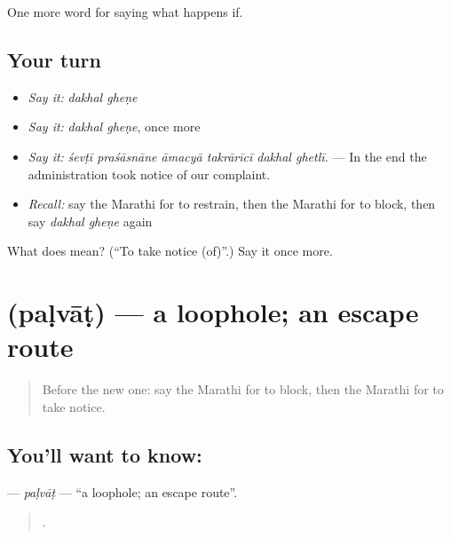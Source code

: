 \begin{grammarlens}[title={What you've built}]
One more word for saying what happens if.
\end{grammarlens}

\subsection*{Your turn}
\begin{itemize}
\raggedright
  \item \emph{Say it:} \emph{dakhal gheṇe}
  \item \emph{Say it:} \emph{dakhal gheṇe}, once more
  \item \emph{Say it:} \emph{śevṭī praśāsnāne āmacyā takrārīcī dakhal ghetlī.} — In the end the administration took notice of our complaint.
  \item \emph{Recall:} say the Marathi for to restrain, then the Marathi for to block, then say \emph{dakhal gheṇe} again
\end{itemize}

\begin{tcolorbox}[breakable,colback=teal!4,colframe=teal!35!black,title={Before you move on}]
What does   mean? (\textquotedblleft{}To take notice (of)\textquotedblright{}.) Say it once more.
\end{tcolorbox}
\section[\texorpdfstring{\mr{पळवाट} (paḷvāṭ)}{पळवाट (paḷvāṭ)}]{ (paḷvāṭ) — a loophole; an escape route}

\label{lesson:MR-C386-palvat}



\begin{quote}
Before the new one: say the Marathi for to block, then the Marathi for to take notice.
\end{quote}

\subsection*{You'll want to know: }
\textbf{} — \emph{paḷvāṭ} — \textquotedblleft{}a loophole; an escape route\textquotedblright{}.

\begin{quote}
    .
\end{quote}

